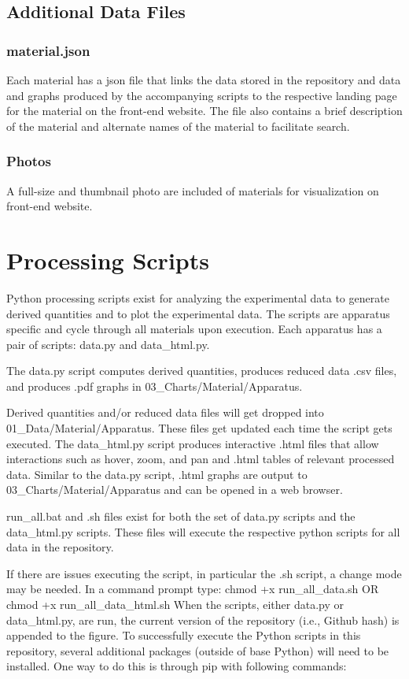 \documentclass[12pt,oneside]{book}
\begin{document}
\subsection{Additional Data Files}

\subsubsection{material.json}
Each material has a json file that links the data stored in the repository and data and graphs produced by the accompanying scripts to the respective landing page for the material on the front-end website. The file also contains a brief description of the material and alternate names of the material to facilitate search.

\subsubsection{Photos}
A full-size and thumbnail photo are included of materials for visualization on front-end website.


\section{Processing Scripts}
\label{sec:scripts}

Python processing scripts exist for analyzing the experimental data to generate derived quantities and to plot the experimental data. The scripts are apparatus specific and cycle through all materials upon execution. Each apparatus has a pair of scripts: data.py and data\_html.py.

The data.py script computes derived quantities, produces reduced data .csv files, and produces .pdf graphs in 03\_Charts/Material/Apparatus.

Derived quantities and/or reduced data files will get dropped into 01\_Data/Material/Apparatus. These files get updated each time the script gets executed.
The data\_html.py script produces interactive .html files that allow interactions such as hover, zoom, and pan and .html tables of relevant processed data. Similar to the data.py script, .html graphs are output to 03\_Charts/Material/Apparatus and can be opened in a web browser.

run\_all.bat and .sh files exist for both the set of data.py scripts and the data\_html.py scripts. These files will execute the respective python scripts for all data in the repository.

If there are issues executing the script, in particular the .sh script, a change mode may be needed. In a command prompt type:
chmod +x run\_all\_data.sh OR chmod +x run\_all\_data\_html.sh
When the scripts, either data.py or data\_html.py, are run, the current version of the repository (i.e., Github hash) is appended to the figure.
To successfully execute the Python scripts in this repository, several additional packages (outside of base Python) will need to be installed. One way to do this is through pip with following commands:
\end{document}
